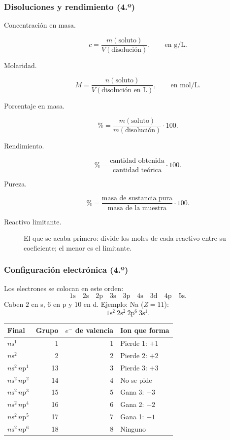 \subsubsection*{Disoluciones y rendimiento (4.º)}

\begin{description}
    \item[Concentración en masa.]
    \[
    c=\frac{m(\mbox{soluto})}{V(\mbox{disolución})},
    \qquad \mbox{en }\mathrm{g/L}.
    \]

    \item[Molaridad.]
    \[
    M=\frac{n(\mbox{soluto})}{V(\mbox{disolución en L})},
    \qquad \mbox{en }\mathrm{mol/L}.
    \]

    \item[Porcentaje en masa.]
    \[
    \%=\frac{m(\mbox{soluto})}{m(\mbox{disolución})}\cdot100.
    \]

    \item[Rendimiento.]
    \[
    \%=\frac{\mbox{cantidad obtenida}}{\mbox{cantidad teórica}}\cdot100.
    \]

    \item[Pureza.]
    \[
    \%=\frac{\mbox{masa de sustancia pura}}{\mbox{masa de la muestra}}\cdot100.
    \]

    \item[Reactivo limitante.]
    El que se acaba primero: divide los moles de cada reactivo entre
    su coeficiente; el menor es el limitante.
\end{description}

\subsubsection*{Configuración electrónica (4.º)}

Los electrones se colocan en este orden:
\[
1\mathrm{s}\quad2\mathrm{s}\quad2\mathrm{p}\quad
3\mathrm{s}\quad3\mathrm{p}\quad4\mathrm{s}\quad
3\mathrm{d}\quad4\mathrm{p}\quad5\mathrm{s}.
\]
Caben $2$ en s, $6$ en p y $10$ en d.
Ejemplo: Na ($Z=11$):
\[
1\mathrm{s}^2\ 2\mathrm{s}^2\ 2\mathrm{p}^6\ 3\mathrm{s}^1.
\]

\begin{center}
\begin{tabular}{lrrl}
\hline
Final & Grupo & $e^{-}$ de valencia & Ion que forma \\
\hline
$n\mathrm{s}^1$ & 1 & 1 & Pierde 1: $+1$ \\
$n\mathrm{s}^2$ & 2 & 2 & Pierde 2: $+2$ \\
$n\mathrm{s}^2\,n\mathrm{p}^1$ & 13 & 3 & Pierde 3: $+3$ \\
$n\mathrm{s}^2\,n\mathrm{p}^2$ & 14 & 4 & No se pide \\
$n\mathrm{s}^2\,n\mathrm{p}^3$ & 15 & 5 & Gana 3: $-3$ \\
$n\mathrm{s}^2\,n\mathrm{p}^4$ & 16 & 6 & Gana 2: $-2$ \\
$n\mathrm{s}^2\,n\mathrm{p}^5$ & 17 & 7 & Gana 1: $-1$ \\
$n\mathrm{s}^2\,n\mathrm{p}^6$ & 18 & 8 & Ninguno \\
\hline
\end{tabular}
\end{center}

